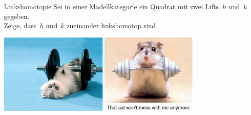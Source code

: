 \documentclass{uebblatt}
\begin{document}
\begin{aufgabe}{Linkshomotopie}
Sei in einer Modellkategorie ein Quadrat mit zwei Lifts~$h$ und~$k$ gegeben. \\
Zeige, dass~$h$ und~$k$ zueinander linkshomotop sind.
\end{aufgabe}

\vfill
\centering
\href{http://fashions-cloud.com/pages/c/cat-lifting-weights/}{\includegraphics[height=4cm]{images/lifting-property-1}}
\qquad
\href{http://www.woophotos.com/weight-lifter/}{\includegraphics[height=4cm]{images/lifting-property-2}}
\par
\end{document}
